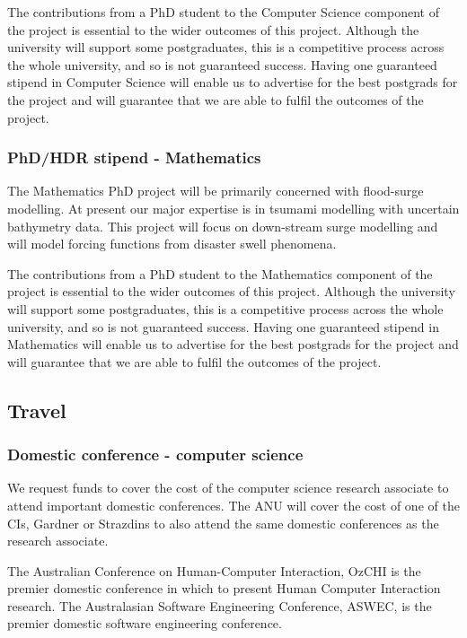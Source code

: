 \documentclass[a4paper,fontsize=12pt]{scrartcl}
\begin{document}
The contributions from a PhD student to the Computer Science component of the project is essential to the wider outcomes of this project.
Although the university will support some postgraduates, this is a competitive
process across the whole university, and so is not guaranteed success. Having one guaranteed stipend in Computer Science will enable us to advertise for the best postgrads for the project and will guarantee that we are able to fulfil the outcomes of the project. 

\subsubsection*{PhD/HDR stipend - Mathematics}

The Mathematics PhD project will be primarily concerned with flood-surge modelling. At present our major expertise is in tsumami modelling with uncertain bathymetry data. This project will focus on down-stream surge modelling and will model forcing functions from disaster swell phenomena. 

The contributions from a PhD student to the Mathematics component of the project is essential to the wider outcomes of this project.
Although the university will support some postgraduates, this is a competitive
process across the whole university, and so is not guaranteed success. Having one guaranteed stipend in Mathematics will enable us to advertise for the best postgrads for the project and will guarantee that we are able to fulfil the outcomes of the project. 

\subsection*{Travel}

\subsubsection*{Domestic conference - computer science}

We request funds to cover the cost of the computer science research associate to attend important domestic conferences.  The ANU will cover the cost of one of the CIs, Gardner or Strazdins to also attend the same domestic conferences as the research associate. 

The Australian Conference on Human-Computer Interaction, OzCHI is the premier domestic conference in which to present Human Computer Interaction research. 
The Australasian Software Engineering Conference, ASWEC, is the premier domestic software engineering conference.
\end{document}
